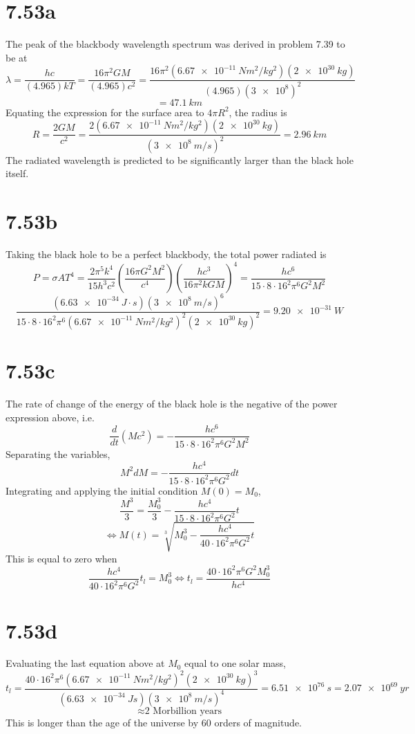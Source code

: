 \documentclass{article}
\begin{document}
\section*{7.53a}
The peak of the blackbody wavelength spectrum was derived in problem 7.39 to be at
\[
  \lambda = \frac{hc}{(4.965)kT}=\frac{16\pi^{2}GM}{(4.965)c^{2}}=\frac{16\pi^{2}(\SI{6.67e-11}{Nm^{2}/kg^{2}})(\SI{2e30}{kg})}
  {(4.965)(\SI{3e8})^{2}}
\]
\[
  =\SI{47.1}{km}
\]
Equating the expression for the surface area to $4\pi R^{2}$, the radius is
\[
  R=\frac{2GM}{c^{2}}=\frac{2(\SI{6.67e-11}{Nm^{2}/kg^{2}})(\SI{2e30}{kg})}{(\SI{3e8}{m/s})^{2}}
  =\SI{2.96}{km}
\]
The radiated wavelength is predicted to be significantly larger than the black hole itself.

\section*{7.53b}
Taking the black hole to be a perfect blackbody, the total power radiated is
\[
  P=\sigma AT^{4}=\frac{2\pi^{5}k^{4}}{15h^{3}c^{2}}\left( \frac{16\pi G^{2}M^{2}}{c^{4}} \right)
  \left( \frac{hc^{3}}{16\pi^{2}kGM} \right)^{4}
  =\frac{hc^{6}}{15\cdot 8\cdot16^{2}\pi^{6}G^{2}M^{2}}
\]
\[
  \frac{(\SI{6.63e-34}{J\cdot s})(\SI{3e8}{m/s})^{6}}
  {15\cdot 8\cdot16^{2}\pi^{6}(\SI{6.67e-11}{Nm^{2}/kg^{2}})^{2}(\SI{2e30}{kg})^{2}}
  =\SI{9.20e-31}{W}
\]

\section*{7.53c}
The rate of change of the energy of the black hole is the negative of the power expression above, i.e.
\[
  \frac{d}{dt}(Mc^{2})=-\frac{hc^{6}}{15\cdot 8\cdot 16^{2}\pi^{6}G^{2}M^{2}}
\]
Separating the variables,
\[
  M^{2}{dM}=-\frac{hc^{4}}{15\cdot 8\cdot 16^{2}\pi^{6}G^{2}}dt
\]
Integrating and applying the initial condition $M(0)=M_{0}$,
\[
  \frac{M^{3}}{3}=\frac{M_{0}^{3}}{3}-\frac{hc^{4}}{15\cdot 8\cdot 16^{2}\pi^{6}G^{2}}t
\]
\[
  \Leftrightarrow M(t)=\sqrt[3]{M_{0}^{3}-\frac{hc^{4}}{40\cdot16^{2}\pi^{6}G^{2}}t}
\]
This is equal to zero when
\[
  \frac{hc^{4}}{40\cdot 16^{2}\pi^{6}G^{2}}t_{l}=M_{0}^{3}
  \Leftrightarrow t_{l}=\frac{40\cdot 16^{2}\pi^{6}G^{2}M_{0}^{3}}{hc^{4}}
\]

\section*{7.53d}
Evaluating the last equation above at $M_{0}$ equal to one solar mass,
\[
  t_{l}=\frac{40\cdot 16^{2}\pi^{6}(\SI{6.67e-11}{Nm^{2}/kg^{2}})^{2}(\SI{2e30}{kg})^{3}}{(\SI{6.63e-34}{J s})(\SI{3e8}{m/s})^{4}}
  =\SI{6.51e76}{s}=\SI{2.07e69}{yr}
\]
\[
  \approx\textrm{2 Morbillion years}
\]
This is longer than the age of the universe by 60 orders of magnitude.
\end{document}
